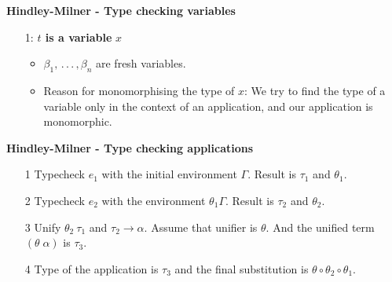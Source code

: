 \documentclass{beamer}
\begin{document}
\begin{frame}[fragile]{\bf Hindley-Milner - Type checking variables}
\begin{enumerate}
    \item[1:] \textbf{$t$ is a variable} $x$ 
    \begin{center}
    \end{center}
    \begin{itemize}
        \item $\beta_1,\,.\,.\,.\,,\beta_n$ are fresh variables.
        \item Reason for monomorphising the type of $x$: We try to find the type of a variable only in the context of an application, and our application is monomorphic.
    \end{itemize}
\end{enumerate}
\end{frame}
\begin{frame}[fragile]{\bf Hindley-Milner - Type checking applications}
\begin{enumerate}
\item[1] Typecheck $e_1$ with the initial environment $\Gamma$. Result is $\tau_1$ and $\theta_1$.
\item[2] Typecheck $e_2$ with the environment $\theta_1\Gamma$. Result is $\tau_2$ and $\theta_2$.
\item[3] Unify $\theta_2\:\tau_1$ and $\tau_2\rightarrow\alpha$. Assume that unifier is $\theta$. And the unified term $\left(\theta\;\alpha\right)$ is $\tau_3$.
\item[4] Type of the application is $\tau_3$ and the final substitution is $\theta\circ\theta_2\circ\theta_1$.
\end{enumerate}
\end{frame}
\end{document}
